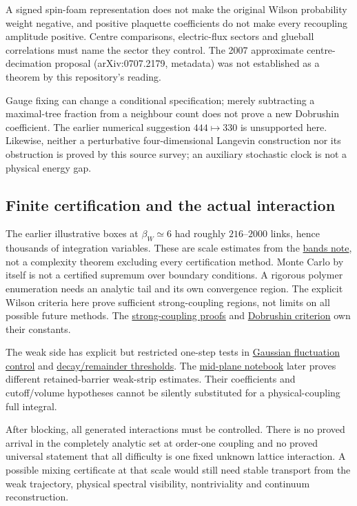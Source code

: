 \documentclass[11pt,a4paper]{article}
\begin{document}
A signed spin-foam representation does not make the original Wilson
probability weight negative, and positive plaquette coefficients do not
make every recoupling amplitude positive. Centre comparisons,
electric-flux sectors and glueball correlations must name the sector
they control. The 2007 approximate centre-decimation proposal
(arXiv:0707.2179, metadata) was not established as a theorem by this
repository's reading.

Gauge fixing can change a conditional specification; merely subtracting
a maximal-tree fraction from a neighbour count does not prove a new
Dobrushin coefficient. The earlier numerical suggestion
\(444\mapsto330\) is unsupported here. Likewise, neither a perturbative
four-dimensional Langevin construction nor its obstruction is proved by
this source survey; an auxiliary stochastic clock is not a physical
energy gap.

\hypertarget{finite-certification-and-the-actual-interaction}{%
\subsection{Finite certification and the actual
interaction}\label{finite-certification-and-the-actual-interaction}}

The earlier illustrative boxes at \(\beta_W\simeq6\) had roughly
\(216\)--\(2000\) links, hence thousands of integration variables. These
are scale estimates from the \href{confinement-scale-bands.md}{bands
note}, not a complexity theorem excluding every certification method.
Monte Carlo by itself is not a certified supremum over boundary
conditions. A rigorous polymer enumeration needs an analytic tail and
its own convergence region. The explicit Wilson criteria here prove
sufficient strong-coupling regions, not limits on all possible future
methods. The \href{wilson-strong-coupling-explicit.md}{strong-coupling
proofs} and \href{dobrushin-uniqueness-wilson.md}{Dobrushin criterion}
own their constants.

The weak side has explicit but restricted one-step tests in
\href{small-field-step-gaussian.md}{Gaussian fluctuation control} and
\href{small-field-step-decay-and-threshold.md}{decay/remainder
thresholds}. The \href{su2-midplane-small-field.md}{mid-plane notebook}
later proves different retained-barrier weak-strip estimates. Their
coefficients and cutoff/volume hypotheses cannot be silently substituted
for a physical-coupling full integral.

After blocking, all generated interactions must be controlled. There is
no proved arrival in the completely analytic set at order-one coupling
and no proved universal statement that all difficulty is one fixed
unknown lattice interaction. A possible mixing certificate at that scale
would still need stable transport from the weak trajectory, physical
spectral visibility, nontriviality and continuum reconstruction.
\end{document}

